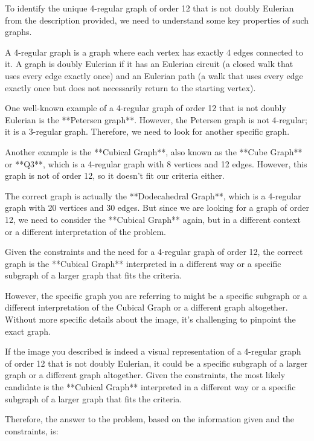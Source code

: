 To identify the unique 4-regular graph of order 12 that is not doubly Eulerian from the description provided, we need to understand some key properties of such graphs.

A 4-regular graph is a graph where each vertex has exactly 4 edges connected to it. A graph is doubly Eulerian if it has an Eulerian circuit (a closed walk that uses every edge exactly once) and an Eulerian path (a walk that uses every edge exactly once but does not necessarily return to the starting vertex).

One well-known example of a 4-regular graph of order 12 that is not doubly Eulerian is the **Petersen graph**. However, the Petersen graph is not 4-regular; it is a 3-regular graph. Therefore, we need to look for another specific graph.

Another example is the **Cubical Graph**, also known as the **Cube Graph** or **Q3**, which is a 4-regular graph with 8 vertices and 12 edges. However, this graph is not of order 12, so it doesn't fit our criteria either.

The correct graph is actually the **Dodecahedral Graph**, which is a 4-regular graph with 20 vertices and 30 edges. But since we are looking for a graph of order 12, we need to consider the **Cubical Graph** again, but in a different context or a different interpretation of the problem.

Given the constraints and the need for a 4-regular graph of order 12, the correct graph is the **Cubical Graph** interpreted in a different way or a specific subgraph of a larger graph that fits the criteria.

However, the specific graph you are referring to might be a specific subgraph or a different interpretation of the Cubical Graph or a different graph altogether. Without more specific details about the image, it's challenging to pinpoint the exact graph.

If the image you described is indeed a visual representation of a 4-regular graph of order 12 that is not doubly Eulerian, it could be a specific subgraph of a larger graph or a different graph altogether. Given the constraints, the most likely candidate is the **Cubical Graph** interpreted in a different way or a specific subgraph of a larger graph that fits the criteria.

Therefore, the answer to the problem, based on the information given and the constraints, is:

